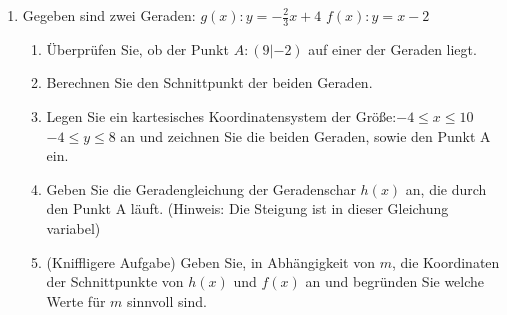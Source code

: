 \documentclass{scrartcl}
\begin{document}
		
	\begin{enumerate}
		\item Gegeben sind zwei Geraden: \quad $g(x): y = - \frac{2}{3}  x + 4$ \quad $f(x): y = x-2$
			\begin{enumerate}
				\item Überprüfen Sie, ob der Punkt $A: (9|-2)$ auf einer der Geraden liegt.
				\item Berechnen Sie den Schnittpunkt der beiden Geraden.
				\item Legen Sie ein kartesisches Koordinatensystem der Größe:\quad $ -4 \leq x \leq 10 $ \quad $-4 \leq y \leq 8$  an und zeichnen Sie die beiden Geraden, sowie den Punkt A ein.
				\item Geben Sie die Geradengleichung der Geradenschar $h(x)$ an, die durch den Punkt A läuft. (Hinweis: Die Steigung ist in dieser Gleichung variabel)
				\item (Kniffligere Aufgabe) Geben Sie, in Abhängigkeit von $m$, die Koordinaten der Schnittpunkte von $h(x)$ und $f(x)$ an und begründen Sie welche Werte für $m$ sinnvoll sind. \\
			\end{enumerate}
			
			
	\end{enumerate} 
	
	
\end{document}
